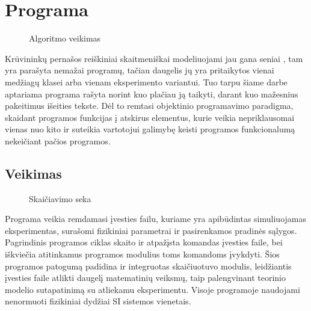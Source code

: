  
\section{Programa}

\begin{figure}
\centering

\caption{Algoritmo veikimas}
  \label{fig:algoritmas}
\end{figure}

Krūvininkų pernašos reiškiniai skaitmeniškai modeliuojami jau gana seniai \cite{juška:4946}, tam yra parašyta nemažai programų, tačiau daugelis jų yra pritaikytos vienai medžiagų klasei arba vienam eksperimento variantui. Tuo tarpu šiame darbe aptariama programa rašyta norint kuo plačiau ją taikyti, darant kuo mažesnius pakeitimus išeities tekste. Dėl to remtasi objektinio programavimo paradigma, skaidant programos funkcijas į atskirus elementus, kurie veikia nepriklausomai vienas nuo kito ir suteikia vartotojui galimybę keisti programos funkcionalumą nekeičiant pačios programos.
\subsection{Veikimas}

\begin{figure}
  \begin{center}
	
  \end{center}
  \caption{Skaičiavimo seka}
  \label{fig:skaičiavimas}
\end{figure}

Programa veikia remdamasi įvesties failu, kuriame yra apibūdintas simuliuojamas eksperimentas, surašomi fizikiniai parametrai ir pasirenkamos pradinės sąlygos. Pagrindinis programos ciklas skaito ir atpažįsta komandas įvesties faile, bei iškviečia atitinkamus programos modulius toms komandoms įvykdyti. Šios programos patogumą padidina ir integruotas skaičiuotuvo modulis, leidžiantis įvesties faile atlikti daugelį matematinių veiksmų, taip palengvinant teorinio modelio sutapatinimą su atliekamu eksperimentu.
Visoje programoje naudojami nenormuoti fizikiniai dydžiai SI sistemos vienetais.
